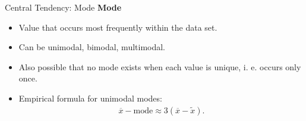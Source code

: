 \begin{frame}{Central Tendency: Mode}
	\textbf{Mode}
	\begin{itemize}
		\item Value that occurs most frequently within the data set.
		\item Can be unimodal, bimodal, multimodal.
		\item Also possible that no mode exists when each value is unique,
		      i. e. occurs only once.
		\item Empirical formula for unimodal modes:
		      \begin{align*}
			      \overline{x} - \text{mode} \approx 3(\overline{x}- \tilde{x}).
		      \end{align*}
	\end{itemize}
\end{frame}

